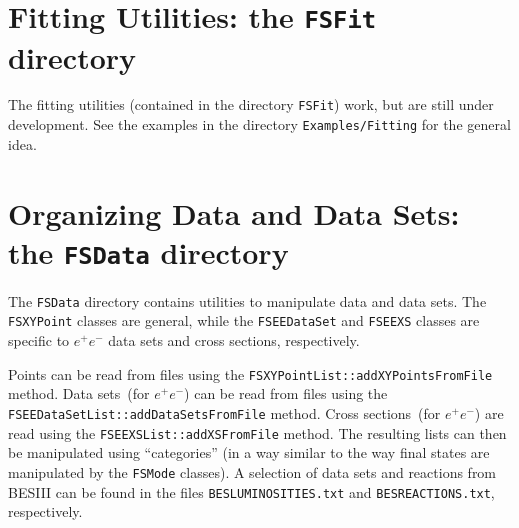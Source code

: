 \documentclass[11pt]{article}
\begin{document}
\section{Fitting Utilities:  the {\tt FSFit} directory}

The fitting utilities (contained in the directory {\tt FSFit}) work, but are still under development.  See the examples in the directory {\tt Examples/Fitting} for the general idea.

\section{Organizing Data and Data Sets: the {\tt FSData} directory}

The {\tt FSData} directory contains utilities to manipulate data and data sets.  The {\tt FSXYPoint} classes are general, while the {\tt FSEEDataSet} and {\tt FSEEXS} classes are specific to $e^+e^-$ data sets and cross sections, respectively.

Points can be read from files using the {\tt FSXYPointList::addXYPointsFromFile} method.
Data sets~(for $e^+e^-$) can be read from files using the {\tt FSEEDataSetList::addDataSetsFromFile} method.  Cross sections~(for $e^+e^-$) are read using the {\tt FSEEXSList::addXSFromFile} method.  The resulting lists can then be manipulated using ``categories'' (in a way similar to the way final states are manipulated by the {\tt FSMode} classes).  A selection of data sets and reactions from BESIII can be found in the files {\tt BESLUMINOSITIES.txt} and {\tt BESREACTIONS.txt}, respectively.
\end{document}
